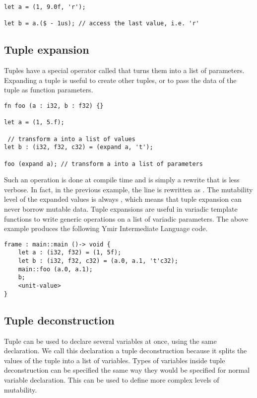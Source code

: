 \begin{lstlisting}[style=coloredverbatim]
let a = (1, 9.0f, 'r');

let b = a.($ - 1us); // access the last value, i.e. 'r'
\end{lstlisting}

\subsection {Tuple expansion}

Tuples have a special operator called  that turns them into a
list of parameters. Expanding a tuple is useful to create other tuples, or to
pass the data of the tuple as function parameters.

\begin{lstlisting}[style=coloredverbatim]
fn foo (a : i32, b : f32) {}

let a = (1, 5.f);

 // transform a into a list of values
let b : (i32, f32, c32) = (expand a, 't');

foo (expand a); // transform a into a list of parameters
\end{lstlisting}

Such an operation is done at compile time and is simply a rewrite that is less
verbose. In fact, in the previous example, the line  is
rewritten as . The mutability level of the expanded
values is always , which means that tuple expansion can never borrow
mutable data. Tuple expansions are useful in variadic template functions to
write generic operations on a list of variadic parameters. The above example produces the following Ymir Intermediate Language code.

\begin{lstlisting}[style=intermediateVerb]
frame : main::main ()-> void {
    let a : (i32, f32) = (1, 5f);
    let b : (i32, f32, c32) = (a.0, a.1, 't'c32);
    main::foo (a.0, a.1);
    b;
    <unit-value>
}
\end{lstlisting}

\subsection {Tuple deconstruction}

Tuple can be used to declare several variables at once, using the same
 declaration. We call this declaration a tuple deconstruction
because it splits the values of the tuple into a list of variables. Types of
variables inside tuple deconstruction can be specified the same way they would
be specified for normal variable declaration. This can be used to define more
complex levels of mutability.

